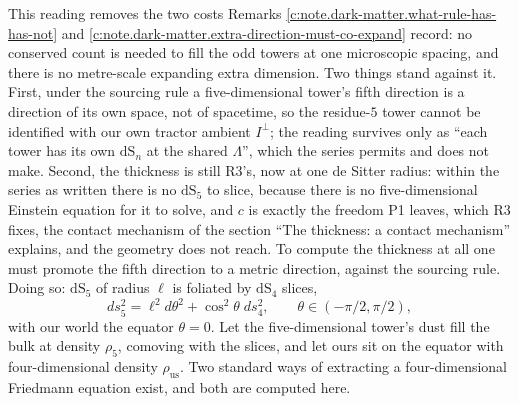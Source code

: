 \documentclass[11pt]{article}
\theoremstyle{definition}
\theoremstyle{plain}
\providecommand{\dS}{}\renewcommand{\dS}{\mathrm{dS}}
\begin{document}
\label{c:note.dark-matter.setting-what-could-fix-unit-de-3}
This reading removes the two costs Remarks \ref{c:note.dark-matter.what-rule-has-has-not} and \ref{c:note.dark-matter.extra-direction-must-co-expand} record: no conserved count is needed to fill the odd towers at one microscopic spacing, and there is no metre-scale expanding extra dimension. Two things stand against it. First, under the sourcing rule a five-dimensional tower's fifth direction is a direction of its own space, not of spacetime, so the residue-$5$ tower cannot be identified with our own tractor ambient $I^{\perp}$; the reading survives only as ``each tower has its own $\dS_{n}$ at the shared $\Lambda$'', which the series permits and does not make. Second, the thickness is still R3's, now at one de Sitter radius: within the series as written there is no $\dS_{5}$ to slice, because there is no five-dimensional Einstein equation for it to solve, and $c$ is exactly the freedom P1 leaves, which R3 fixes, the contact mechanism of the section ``The thickness: a contact mechanism'' explains, and the geometry does not reach. To compute the thickness at all one must promote the fifth direction to a metric direction, against the sourcing rule. Doing so: $\dS_{5}$ of radius $\ell$ is foliated by $\dS_{4}$ slices,
\begin{equation}
ds_{5}^{2} = \ell^{2}d\theta^{2} + \cos^{2}\theta\; ds_{4}^{2}, \qquad \theta \in (-\pi/2, \pi/2),
\end{equation}
with our world the equator $\theta = 0$. Let the five-dimensional tower's dust fill the bulk at density $\rho_{5}$, comoving with the slices, and let ours sit on the equator with four-dimensional density $\rho_{\mathrm{us}}$. Two standard ways of extracting a four-dimensional Friedmann equation exist, and both are computed here.
\end{document}
